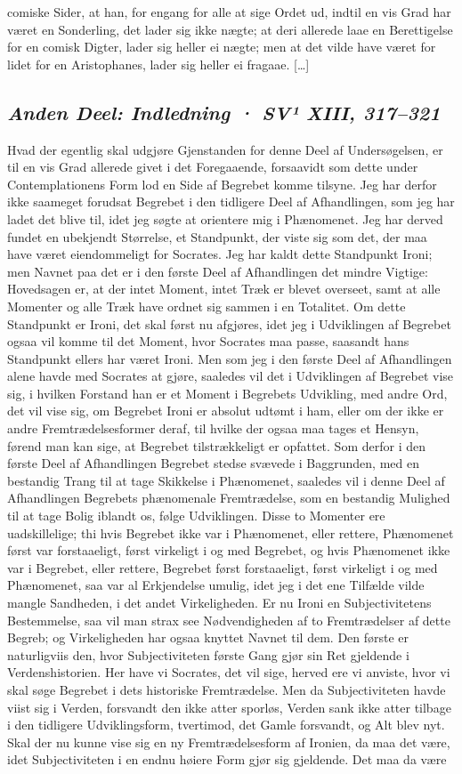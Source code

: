 \documentclass[12pt,a4paper]{article}
\newcommand{\sectionheading}[1]{\subsection*{\normalfont\itshape #1}}
\begin{document}
comiske Sider, at han, for engang for alle at sige Ordet ud, indtil en vis Grad har været en Sonderling, det lader sig ikke nægte; at deri allerede laae en Berettigelse for en comisk Digter, lader sig heller ei nægte; men at det vilde have været for lidet for en Aristophanes, lader sig heller ei fragaae. […]

\sectionheading{Anden Deel: Indledning  ·  SV¹ XIII, 317–321}

Hvad der egentlig skal udgjøre Gjenstanden for denne Deel af Undersøgelsen, er til en vis Grad allerede givet i det Foregaaende, forsaavidt som dette under Contemplationens Form lod en Side af Begrebet komme tilsyne. Jeg har derfor ikke saameget forudsat Begrebet i den tidligere Deel af Afhandlingen, som jeg har ladet det blive til, idet jeg søgte at orientere mig i Phænomenet. Jeg har derved fundet en ubekjendt Størrelse, et Standpunkt, der viste sig som det, der maa have været eiendommeligt for Socrates. Jeg har kaldt dette Standpunkt Ironi; men Navnet paa det er i den første Deel af Afhandlingen det mindre Vigtige: Hovedsagen er, at der intet Moment, intet Træk er blevet overseet, samt at alle Momenter og alle Træk have ordnet sig sammen i en Totalitet. Om dette Standpunkt er Ironi, det skal først nu afgjøres, idet jeg i Udviklingen af Begrebet ogsaa vil komme til det Moment, hvor Socrates maa passe, saasandt hans Standpunkt ellers har været Ironi. Men som jeg i den første Deel af Afhandlingen alene havde med Socrates at gjøre, saaledes vil det i Udviklingen af Begrebet vise sig, i hvilken Forstand han er et Moment i Begrebets Udvikling, med andre Ord, det vil vise sig, om Begrebet Ironi er absolut udtømt i ham, eller om der ikke er andre Fremtrædelsesformer deraf, til hvilke der ogsaa maa tages et Hensyn, førend man kan sige, at Begrebet tilstrækkeligt er opfattet. Som derfor i den første Deel af Afhandlingen Begrebet stedse svævede i Baggrunden, med en bestandig Trang til at tage Skikkelse i Phænomenet, saaledes vil i denne Deel af Afhandlingen Begrebets phænomenale Fremtrædelse, som en bestandig Mulighed til at tage Bolig iblandt os, følge Udviklingen. Disse to Momenter ere uadskillelige; thi hvis Begrebet ikke var i Phænomenet, eller rettere, Phænomenet først var forstaaeligt, først virkeligt i og med Begrebet, og hvis Phænomenet ikke var i Begrebet, eller rettere, Begrebet først forstaaeligt, først virkeligt i og med Phænomenet, saa var al Erkjendelse umulig, idet jeg i det ene Tilfælde vilde mangle Sandheden, i det andet Virkeligheden. Er nu Ironi en Subjectivitetens Bestemmelse, saa vil man strax see Nødvendigheden af to Fremtrædelser af dette Begreb; og Virkeligheden har ogsaa knyttet Navnet til dem. Den første er naturligviis den, hvor Subjectiviteten første Gang gjør sin Ret gjeldende i Verdenshistorien. Her have vi Socrates, det vil sige, herved ere vi anviste, hvor vi skal søge Begrebet i dets historiske Fremtrædelse. Men da Subjectiviteten havde viist sig i Verden, forsvandt den ikke atter sporløs, Verden sank ikke atter tilbage i den tidligere Udviklingsform, tvertimod, det Gamle forsvandt, og Alt blev nyt. Skal der nu kunne vise sig en ny Fremtrædelsesform af Ironien, da maa det være, idet Subjectiviteten i en endnu høiere Form gjør sig gjeldende. Det maa da være 
\end{document}
